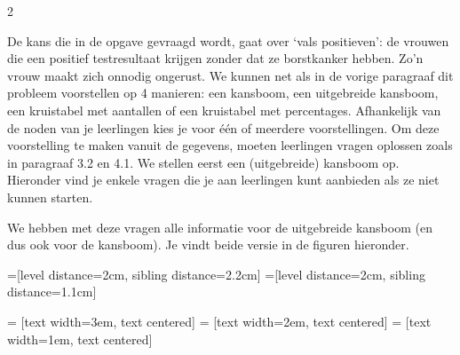 \begin{multicols}{2} %

De kans die in de opgave gevraagd wordt, gaat over ‘vals positieven’: de vrouwen die een positief testresultaat krijgen zonder dat ze borstkanker hebben. Zo’n vrouw maakt zich onnodig ongerust.
We kunnen net als in de vorige paragraaf dit probleem voorstellen op 4 manieren: een kansboom, een uitgebreide kansboom, een kruistabel met aantallen of een kruistabel met percentages. Afhankelijk van de noden van je leerlingen kies je voor één of meerdere voorstellingen. Om deze voorstelling te maken vanuit de gegevens, moeten leerlingen vragen oplossen zoals in paragraaf 3.2 en 4.1. We stellen eerst een (uitgebreide) kansboom op. Hieronder vind je enkele vragen die je aan leerlingen kunt aanbieden als ze niet kunnen starten.
\begin{vraagenantwoord}
\end{vraagenantwoord}
We hebben met deze vragen alle informatie voor de uitgebreide kansboom (en dus ook voor de kansboom). Je vindt beide versie in de figuren hieronder.

=[level distance=2cm, sibling distance=2.2cm]
=[level distance=2cm, sibling distance=1.1cm]

 = [text width=3em, text centered]
 = [text width=2em, text centered]
 = [text width=1em, text centered]


\end{multicols}
